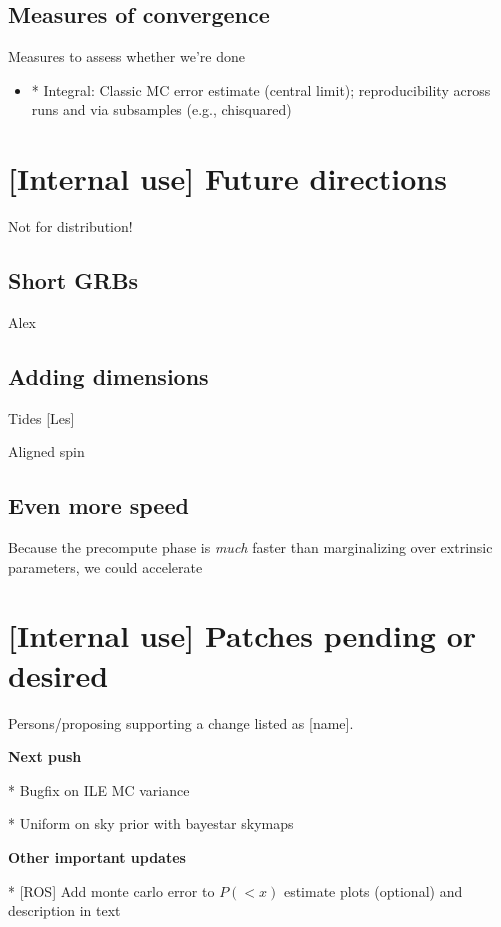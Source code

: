 \subsection{Measures of convergence}

Measures to assess whether we're done
\begin{itemize}
\item * Integral: Classic MC error estimate (central limit); reproducibility across runs and via subsamples (e.g., chisquared)
\end{itemize}

\section{[Internal use] Future directions}

Not for distribution!

\subsection{Short GRBs}

Alex

\subsection{Adding dimensions}

Tides [Les]

Aligned spin

\subsection{Even more speed}

Because the precompute phase is \emph{much} faster than marginalizing over extrinsic parameters, we could accelerate

\section{[Internal use] Patches pending or desired}

Persons/proposing supporting  a change listed as [name].

\noindent \textbf{Next push}

* Bugfix on ILE MC variance

* Uniform on sky prior with bayestar skymaps

\noindent \textbf{Other important updates}

* [ROS] Add monte carlo error to $P(<x)$ estimate plots (optional) and description in text

